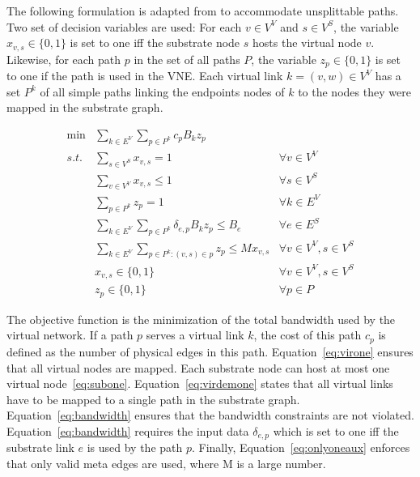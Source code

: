 \documentclass[12pt]{article}
\begin{document}
The following formulation is adapted from \cite{hu:2013} to accommodate unsplittable paths. 
Two set of decision variables are used: For each $v \in V^{V}$ and $s \in V^{S}$, the variable $x_{v,s} \in \{0,1\}$ is set to one iff the substrate node $s$ hosts the virtual node $v$. 
Likewise, for each path $p$ in the set of all paths $P$, the variable $z_{p} \in \{0,1\}$ is set to one if the path is used in the VNE. 
Each virtual link $k=(v,w) \in V^V$ has a set $P^k$ of all simple paths linking the endpoints nodes of $k$ to the nodes they were mapped in the substrate graph.

\begin{align}
  \min  & \sum\limits_{k \in E^{V}}\sum\limits_{p \in P^k}  c_{p} B_k z_{p} \label{eq:obj} \\
  s.t.  & \sum\limits_{s \in V^{S}} x_{v,s} = 1                                  & \forall v \in V^{V} \label{eq:virone} \\
        & \sum\limits_{v \in V^{V}} x_{v,s} \leq 1                               & \forall s \in V^{S} \label{eq:subone} \\
        & \sum\limits_{p \in P^{k}} z_{p} = 1                                    & \forall k \in E^{V} \label{eq:virdemone} \\
        & \sum\limits_{k \in E^{V}}\sum\limits_{p \in P^{k}} \delta_{e,p} B_{k} z_{p} \leq B_{e} & \forall e \in E^{S} \label{eq:bandwidth} \\
        & \sum\limits_{k \in E^{V}}\sum\limits_{p \in P^k : (v,s) \in p} z_{p} \leq M x_{v,s} & \forall v \in V^{V}, s \in V^{S} \label{eq:onlyoneaux}\\
        &  x_{v,s} \in \{0,1\}  & \forall v \in V^{V}, s \in V^{S} \nonumber \\
        & z_{p} \in \{0,1\}    & \forall p \in {P} \nonumber
\end{align}

The objective function is the minimization of the total bandwidth used by the virtual network. If a path $p$ serves a virtual link $k$, the cost of this path $c_{p}$ is defined as the number of physical edges in this path.
Equation~\eqref{eq:virone} ensures that all virtual nodes are mapped. Each substrate node can host at most one virtual node~\eqref{eq:subone}.
Equation~\eqref{eq:virdemone} states that all virtual links have to be mapped to a single path in the substrate graph. Equation~\eqref{eq:bandwidth} ensures that the bandwidth constraints are not violated.
Equation~\ref{eq:bandwidth} requires the input data $\delta_{e,p}$ which is set to one iff the substrate link $e$ is used by the path $p$.
Finally, Equation~\eqref{eq:onlyoneaux} enforces that only valid meta edges are used, where M is a large number.
\end{document}
